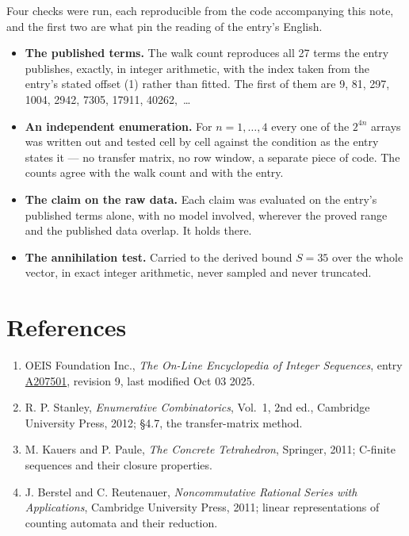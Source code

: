 \documentclass[11pt]{article}
\theoremstyle{definition}
\begin{document}
Four checks were run, each reproducible from the code accompanying this note, and the first two are what pin the reading of the entry's English.

\begin{itemize}

\item {\bfseries The published terms.} The walk count reproduces all 27 terms the entry publishes, exactly, in integer arithmetic, with the index taken from the entry's stated offset (1) rather than fitted. The first of them are 9, 81, 297, 1004, 2942, 7305, 17911, 40262,~\dots

\item {\bfseries An independent enumeration.} For $n = 1,\dots,4$ every one of the $2^{4n}$ arrays was written out and tested cell by cell against the condition as the entry states it --- no transfer matrix, no row window, a separate piece of code. The counts agree with the walk count and with the entry.

\item {\bfseries The claim on the raw data.} Each claim was evaluated on the entry's published terms alone, with no model involved, wherever the proved range and the published data overlap. It holds there.

\item {\bfseries The annihilation test.} Carried to the derived bound $S = 35$ over the whole vector, in exact integer arithmetic, never sampled and never truncated.

\end{itemize}

\section{References}

\begin{enumerate}

\item OEIS Foundation Inc., \emph{The On-Line Encyclopedia of Integer Sequences}, entry \href{https://oeis.org/A207501}{A207501}, revision 9, last modified Oct 03 2025.

\item R. P. Stanley, \emph{Enumerative Combinatorics}, Vol.~1, 2nd ed., Cambridge University Press, 2012; \S4.7, the transfer-matrix method.

\item M. Kauers and P. Paule, \emph{The Concrete Tetrahedron}, Springer, 2011; C-finite sequences and their closure properties.

\item J. Berstel and C. Reutenauer, \emph{Noncommutative Rational Series with Applications}, Cambridge University Press, 2011; linear representations of counting automata and their reduction.

\end{enumerate}
\end{document}
